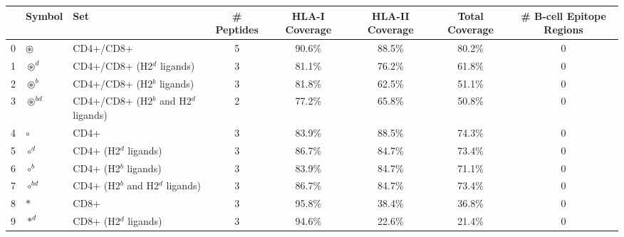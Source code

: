 \begin{tabular}{rllccccc}
\toprule
{} &                                               Symbol &                                      Set &  \# Peptides & HLA-I Coverage & HLA-II Coverage & Total Coverage &  \# B-cell Epitope Regions \\
\midrule
0  &                                      $ \circledast $ &                                CD4+/CD8+ &            5 &         90.6\% &          88.5\% &         80.2\% &                          0 \\
1  &                                    $ \circledast^d $ &               CD4+/CD8+ (H2$^d$ ligands) &            3 &         81.1\% &          76.2\% &         61.8\% &                          0 \\
2  &                                    $ \circledast^b $ &               CD4+/CD8+ (H2$^b$ ligands) &            3 &         81.8\% &          62.5\% &         51.1\% &                          0 \\
3  &                                 $ \circledast^{bd} $ &    CD4+/CD8+ (H2$^b$ and H2$^d$ ligands) &            2 &         77.2\% &          65.8\% &         50.8\% &                          0 \\
4  &                                            $ \circ $ &                                     CD4+ &            3 &         83.9\% &          88.5\% &         74.3\% &                          0 \\
5  &                                          $ \circ^d $ &                    CD4+ (H2$^d$ ligands) &            3 &         86.7\% &          84.7\% &         73.4\% &                          0 \\
6  &                                          $ \circ^b $ &                    CD4+ (H2$^b$ ligands) &            3 &         83.9\% &          84.7\% &         71.1\% &                          0 \\
7  &                                       $ \circ^{bd} $ &         CD4+ (H2$^b$ and H2$^d$ ligands) &            3 &         86.7\% &          84.7\% &         73.4\% &                          0 \\
8  &                                             $ \ast $ &                                     CD8+ &            3 &         95.8\% &          38.4\% &         36.8\% &                          0 \\
9  &                                           $ \ast^d $ &                    CD8+ (H2$^d$ ligands) &            3 &         94.6\% &          22.6\% &         21.4\% &                          0 \\

\end{tabular}
